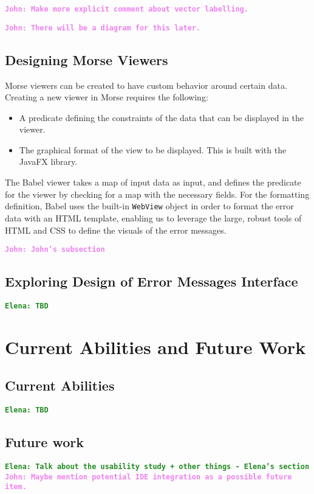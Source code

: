 \documentclass[12pt]{article}
\newcommand{\comment}[1]{{\bf \tt  {#1}}}
\newcommand{\emcomment}[1]{\textcolor{ForestGreen}{\comment{Elena: {#1}}}}
\newcommand{\jwcomment}[1]{\textcolor{violet}{\comment{John: {#1}}}}
\begin{document}
\jwcomment{Make more explicit comment about vector labelling.}

\jwcomment{There will be a diagram for this later.}

\subsection{Designing Morse Viewers}\label{subsec:Morse-Viewers}
Morse viewers can be created to have custom behavior around certain data.
Creating a new viewer in Morse requires the following:
\begin{itemize}
	\item A predicate defining the constraints of the data that can be displayed in the viewer.
	\item The graphical format of the view to be displayed. This is built with the JavaFX library. 
\end{itemize}
The Babel viewer takes a map of input data as input, and defines the predicate for the viewer by checking for a map with the necessary fields.
For the formatting definition, Babel uses the built-in \texttt{WebView} object in order to format the error data with an HTML template,
enabling us to leverage the large, robust tools of HTML and CSS to define the visuals of the error messages.


\jwcomment{John's subsection}

\subsection{Exploring Design of Error Messages Interface}\label{subsec:interface}
\emcomment{TBD}

		
\section{Current Abilities and Future Work}\label{sec:conclusion}
	\subsection{Current Abilities}\label{subsec:current-abilities}
	\emcomment{TBD}
	

	\subsection{Future work}\label{subsec:future}
	\emcomment{Talk about the usability study + other things - Elena's section}
	\jwcomment{Maybe mention potential IDE integration as a possible future item.}



\end{document}
